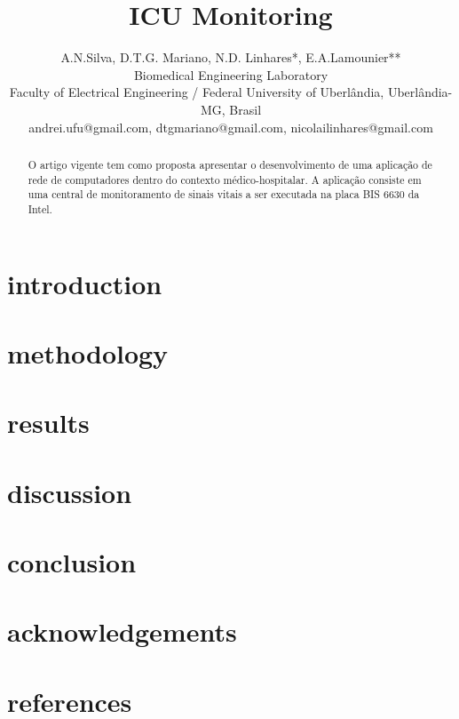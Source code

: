 \documentclass[a4paper,11pt]{article}
\title{ICU Monitoring }
\author{A.N.Silva, D.T.G. Mariano, N.D. Linhares*, E.A.Lamounier**\\Biomedical Engineering Laboratory\\ Faculty of Electrical Engineering / Federal University of Uberlândia, Uberlândia-MG, Brasil\\andrei.ufu@gmail.com, dtgmariano@gmail.com, nicolailinhares@gmail.com}
\begin{document}
\maketitle
\tableofcontents


\begin{abstract}
O artigo vigente tem como proposta apresentar o desenvolvimento de uma aplicação de rede de computadores dentro do contexto médico-hospitalar. A aplicação consiste em uma central de monitoramento de sinais vitais a ser executada na placa BIS 6630 da Intel.
\end{abstract}

\section{introduction}

\section{methodology}

\section{results}

\section{discussion}

\section{conclusion}

\section{acknowledgements}

\section{references}
\end{document}
